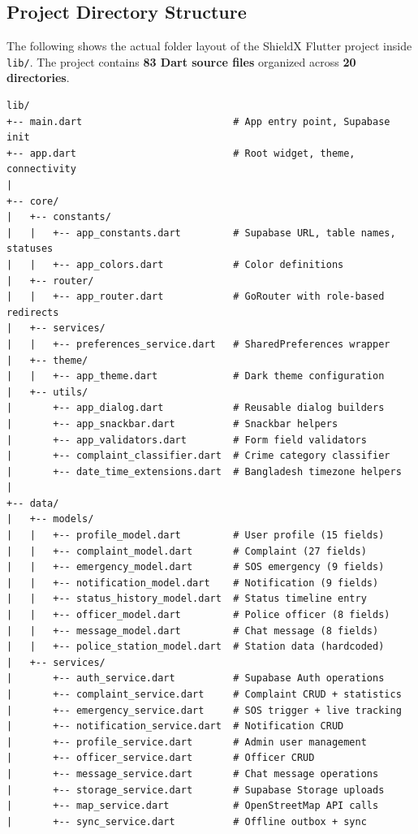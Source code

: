 \documentclass[12pt, a4paper, twoside]{report}
\begin{document}
\subsection{Project Directory Structure}
The following shows the actual folder layout of the ShieldX Flutter project inside \texttt{lib/}. The project contains \textbf{83 Dart source files} organized across \textbf{20 directories}.
\begin{footnotesize}
\begin{verbatim}
lib/
+-- main.dart                          # App entry point, Supabase init
+-- app.dart                           # Root widget, theme, connectivity
|
+-- core/
|   +-- constants/
|   |   +-- app_constants.dart         # Supabase URL, table names, statuses
|   |   +-- app_colors.dart            # Color definitions
|   +-- router/
|   |   +-- app_router.dart            # GoRouter with role-based redirects
|   +-- services/
|   |   +-- preferences_service.dart   # SharedPreferences wrapper
|   +-- theme/
|   |   +-- app_theme.dart             # Dark theme configuration
|   +-- utils/
|       +-- app_dialog.dart            # Reusable dialog builders
|       +-- app_snackbar.dart          # Snackbar helpers
|       +-- app_validators.dart        # Form field validators
|       +-- complaint_classifier.dart  # Crime category classifier
|       +-- date_time_extensions.dart  # Bangladesh timezone helpers
|
+-- data/
|   +-- models/
|   |   +-- profile_model.dart         # User profile (15 fields)
|   |   +-- complaint_model.dart       # Complaint (27 fields)
|   |   +-- emergency_model.dart       # SOS emergency (9 fields)
|   |   +-- notification_model.dart    # Notification (9 fields)
|   |   +-- status_history_model.dart  # Status timeline entry
|   |   +-- officer_model.dart         # Police officer (8 fields)
|   |   +-- message_model.dart         # Chat message (8 fields)
|   |   +-- police_station_model.dart  # Station data (hardcoded)
|   +-- services/
|       +-- auth_service.dart          # Supabase Auth operations
|       +-- complaint_service.dart     # Complaint CRUD + statistics
|       +-- emergency_service.dart     # SOS trigger + live tracking
|       +-- notification_service.dart  # Notification CRUD
|       +-- profile_service.dart       # Admin user management
|       +-- officer_service.dart       # Officer CRUD
|       +-- message_service.dart       # Chat message operations
|       +-- storage_service.dart       # Supabase Storage uploads
|       +-- map_service.dart           # OpenStreetMap API calls
|       +-- sync_service.dart          # Offline outbox + sync

\end{verbatim}
\end{footnotesize}
\end{document}
